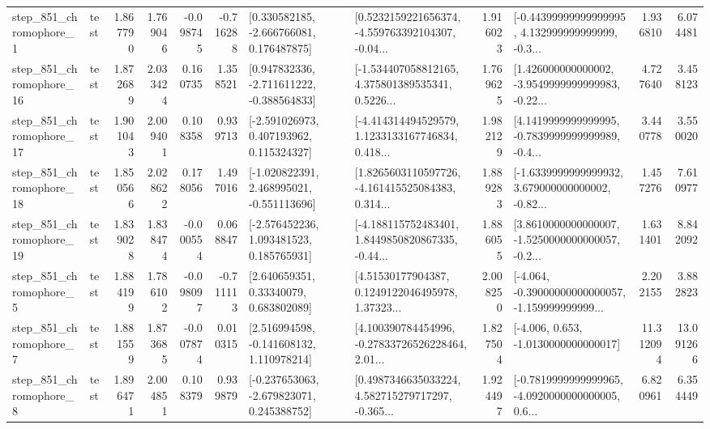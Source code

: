\begin{tabular}{llrrrrllrlrr}
   step\_851\_chromophore\_1 &      test &      1.867790 &    1.769046 &     -0.098745 & -0.716288 &    [0.330582185, -2.666766081, 0.176487875] &  [0.5232159221656374, -4.559763392104307, -0.04... &       1.916023 &  [-0.44399999999999995, 4.132999999999999, -0.3... &            1.936810 &          6.074481 \\
  step\_851\_chromophore\_16 &      test &      1.872689 &    2.033424 &      0.160735 &  1.358521 &   [0.947832336, -2.711611222, -0.388564833] &  [-1.534407058812165, 4.375801389535341, 0.5226... &       1.769625 &  [1.426000000000002, -3.9549999999999983, -0.22... &            4.727640 &          3.458123 \\
  step\_851\_chromophore\_17 &      test &      1.901043 &    2.009401 &      0.108358 &  0.939713 &    [-2.591026973, 0.407193962, 0.115324327] &  [-4.414314494529579, 1.1233133167746834, 0.418... &       1.982129 &  [4.1419999999999995, -0.7839999999999989, -0.4... &            3.440778 &          3.550020 \\
  step\_851\_chromophore\_18 &      test &      1.850566 &    2.028622 &      0.178056 &  1.497016 &   [-1.020822391, 2.468995021, -0.551113696] &  [1.8265603110597726, -4.161415525084383, 0.314... &       1.889283 &  [-1.6339999999999932, 3.679000000000002, -0.82... &            1.457276 &          7.610977 \\
  step\_851\_chromophore\_19 &      test &      1.839028 &    1.838474 &     -0.000554 &  0.068847 &    [-2.576452236, 1.093481523, 0.185765931] &  [-4.188115752483401, 1.8449850820867335, -0.44... &       1.886055 &  [3.8610000000000007, -1.5250000000000057, -0.2... &            1.631401 &          8.842092 \\
   step\_851\_chromophore\_5 &      test &      1.884199 &    1.786102 &     -0.098097 & -0.711113 &      [2.640659351, 0.33340079, 0.683802089] &  [4.51530177904387, 0.1249122046495978, 1.37323... &       2.008250 &  [-4.064, -0.39000000000000057, -1.159999999999... &            2.202155 &          3.882823 \\
   step\_851\_chromophore\_7 &      test &      1.881559 &    1.873685 &     -0.007874 &  0.010315 &    [2.516994598, -0.141608132, 1.110978214] &  [4.100390784454996, -0.27833726526228464, 2.01... &       1.827504 &               [-4.006, 0.653, -1.0130000000000017] &           11.312094 &         13.091266 \\
   step\_851\_chromophore\_8 &      test &      1.896471 &    2.004851 &      0.108379 &  0.939879 &   [-0.237653063, -2.679823071, 0.245388752] &  [0.4987346635033224, 4.582715279717297, -0.365... &       1.924497 &  [-0.7819999999999965, -4.0920000000000005, 0.6... &            6.820961 &          6.354449 \\

\end{tabular}

